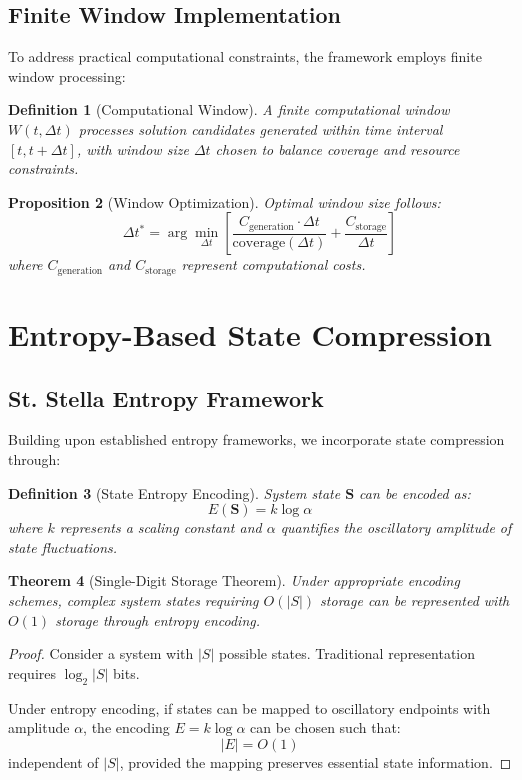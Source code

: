 \documentclass[11pt,a4paper]{article}
\newtheorem{theorem}{Theorem}[section]
\newtheorem{definition}[theorem]{Definition}
\newtheorem{proposition}[theorem]{Proposition}
\theoremstyle{remark}
\begin{document}
\subsection{Finite Window Implementation}

To address practical computational constraints, the framework employs finite window processing:

\begin{definition}[Computational Window]
A finite computational window $W(t, \Delta t)$ processes solution candidates generated within time interval $[t, t+\Delta t]$, with window size $\Delta t$ chosen to balance coverage and resource constraints.
\end{definition}

\begin{proposition}[Window Optimization]
Optimal window size follows:
$$\Delta t^* = \arg\min_{\Delta t} \left[ \frac{C_{\text{generation}} \cdot \Delta t}{\text{coverage}(\Delta t)} + \frac{C_{\text{storage}}}{\Delta t} \right]$$
where $C_{\text{generation}}$ and $C_{\text{storage}}$ represent computational costs.
\end{proposition}

\section{Entropy-Based State Compression}

\subsection{St. Stella Entropy Framework}

Building upon established entropy frameworks, we incorporate state compression through:

\begin{definition}[State Entropy Encoding]
System state $\mathbf{S}$ can be encoded as:
$$E(\mathbf{S}) = k \log \alpha$$
where $k$ represents a scaling constant and $\alpha$ quantifies the oscillatory amplitude of state fluctuations.
\end{definition}

\begin{theorem}[Single-Digit Storage Theorem]
Under appropriate encoding schemes, complex system states requiring $O(|S|)$ storage can be represented with $O(1)$ storage through entropy encoding.
\end{theorem}

\begin{proof}
Consider a system with $|S|$ possible states. Traditional representation requires $\log_2|S|$ bits.

Under entropy encoding, if states can be mapped to oscillatory endpoints with amplitude $\alpha$, the encoding $E = k \log \alpha$ can be chosen such that:
$$|E| = O(1)$$
independent of $|S|$, provided the mapping preserves essential state information.
\end{proof}
\end{document}
